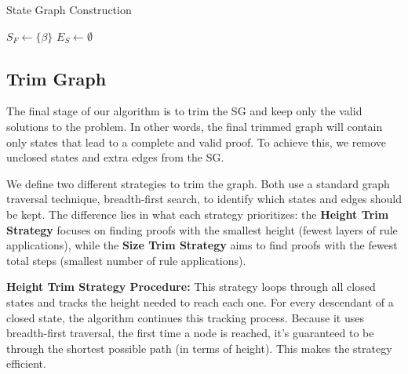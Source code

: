 \documentclass[runningheads]{llncs}
\begin{document}
\begin{algorithm}
\caption{State Graph Construction}

$S_F \leftarrow \{\beta\}$ 
$E_S \leftarrow \emptyset$ 

\end{algorithm}

\subsection{Trim Graph}

The final stage of our algorithm is to trim the SG and keep only the valid solutions to the problem. In other words, the final trimmed graph will contain only states that lead to a complete and valid proof. To achieve this, we remove unclosed states and extra edges from the SG.

We define two different strategies to trim the graph. Both use a standard graph traversal technique, breadth-first search, to identify which states and edges should be kept. The difference lies in what each strategy prioritizes: the \textbf{Height Trim Strategy} focuses on finding proofs with the smallest height (fewest layers of rule applications), while the \textbf{Size Trim Strategy} aims to find proofs with the fewest total steps (smallest number of rule applications).


\vspace{1em}
\textbf{Height Trim Strategy Procedure:}  
This strategy loops through all closed states and tracks the height needed to reach each one. For every descendant of a closed state, the algorithm continues this tracking process. Because it uses breadth-first traversal, the first time a node is reached, it’s guaranteed to be through the shortest possible path (in terms of height). This makes the strategy efficient.
\end{document}
